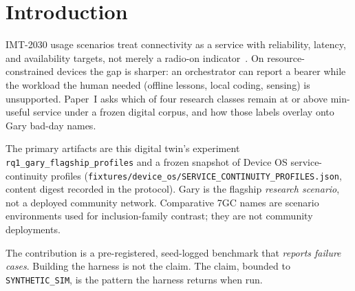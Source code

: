 \section{Introduction}
\label{sec:intro}
IMT-2030 usage scenarios treat connectivity as a service with reliability, latency, and availability targets, not merely a radio-on indicator~\cite{itur_m2160,3gpp_ts22261}.
On resource-constrained devices the gap is sharper: an orchestrator can report a bearer while the workload the human needed (offline lessons, local coding, sensing) is unsupported.
Paper~I asks which of four research classes remain at or above min-useful service under a frozen digital corpus, and how those labels overlay onto Gary bad-day names.

The primary artifacts are this digital twin's experiment \texttt{rq1\_gary\_flagship\_profiles} and a frozen snapshot of Device OS service-continuity profiles (\texttt{fixtures/device\_os/SERVICE\_CONTINUITY\_PROFILES.json}, content digest recorded in the protocol).
Gary is the flagship \emph{research scenario}, not a deployed community network.
Comparative 7GC names are scenario environments used for inclusion-family contrast; they are not community deployments.

The contribution is a pre-registered, seed-logged benchmark that \emph{reports failure cases}.
Building the harness is not the claim. The claim, bounded to \texttt{SYNTHETIC\_SIM}, is the pattern the harness returns when run.
